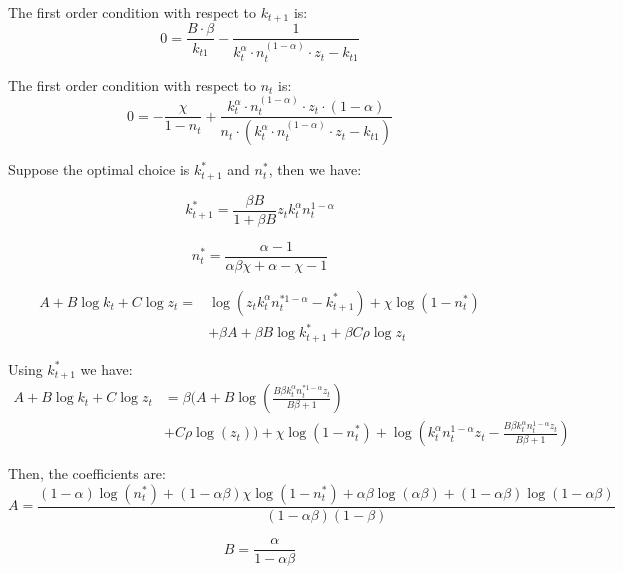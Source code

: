 \documentclass{article}
\begin{document}
The first order condition with respect to \(k_{t+1}\) is:
\begin{equation}
   0 = \frac{{B \cdot \beta}}{{k_{t1}}} - \frac{1}{{k_t^{\alpha} \cdot n_t^{(1 - \alpha)} \cdot z_t - k_{t1}}}
\end{equation}

The first order condition with respect to \(n_t\) is:
\begin{equation}
    0 = -\frac{{\chi}}{{1 - n_t}} + \frac{{k_t^{\alpha} \cdot n_t^{(1 - \alpha)} \cdot z_t \cdot (1 - \alpha)}}{{n_t \cdot (k_t^{\alpha} \cdot n_t^{(1 - \alpha)} \cdot z_t - k_{t1})}}
\end{equation}

Suppose the optimal choice is \(k^*_{t+1}\) and \(n^*_t\), then we have:

\begin{equation}
    k^*_{t+1} = \frac{\beta B}{1 + \beta B} z_t k_t^\alpha n_t^{1-\alpha}
\end{equation}

\begin{equation}
    n^*_t = \frac{{\alpha - 1}}{{\alpha \beta \chi + \alpha - \chi - 1}}
\end{equation}

\begin{align*}
    A +  B \log k_t + C \log z_t = & \log\left(z_t k_t^\alpha n_t^{* 1-\alpha} - k^*_{t+1}\right) + \chi \log\left( 1 - n^*_t\right) \\
    & + \beta A + \beta B \log k^*_{t+1} + \beta C \rho \log z_t
\end{align*}

Using \(k^*_{t+1}\) we have:
\begin{align*}
    A +  B \log k_t + C \log z_t &= \beta ( A + B \log ( \frac{B \beta k_t^\alpha n_t^{* 1 - \alpha} z_t}{B \beta + 1} ) \\
    &+ C \rho \log(z_t) ) + \chi \log\left( 1 - n^*_t\right) + \log ( k_t^\alpha n_t^{1 - \alpha} z_t - \frac{B \beta k_t^\alpha n_t^{1 - \alpha} z_t}{B \beta + 1} )
\end{align*}

Then, the coefficients are:\\
\begin{equation}
    A = \frac{(1-\alpha)\log(n^*_t) + (1 - \alpha\beta)\chi\log(1 - n^*_t) + \alpha\beta\log(\alpha\beta) +(1- \alpha\beta)\log(1-\alpha\beta)}{(1 - \alpha\beta)(1 - \beta)}
\end{equation}

\begin{equation}
    B = \frac{\alpha}{1-\alpha\beta}
\end{equation}
\end{document}
